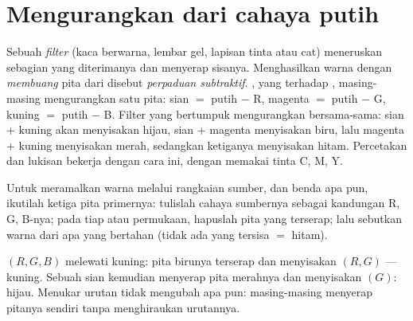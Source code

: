 \section{Mengurangkan dari cahaya putih}

\begin{definition}\label{def:g11:color-light-sources:subtractive}
Sebuah \emph{filter} (kaca berwarna, lembar gel, lapisan
tinta atau cat) meneruskan sebagian  yang diterimanya dan
menyerap sisanya. Menghasilkan warna dengan \emph{membuang} pita dari
 disebut \emph{perpaduan
subtraktif}. , yang
 terhadap , masing-masing mengurangkan
satu pita: sian $=$ putih $-$ R, magenta $=$ putih $-$ G, kuning $=$
putih $-$ B. Filter yang bertumpuk mengurangkan bersama-sama: sian $+$
kuning akan menyisakan hijau, sian $+$ magenta menyisakan biru,
lalu magenta $+$ kuning menyisakan merah, sedangkan ketiganya
menyisakan hitam. Percetakan dan lukisan bekerja dengan cara ini,
dengan memakai tinta C, M, Y.
\end{definition}

\begin{method}\label{met:g11:color-light-sources:bookkeeping}
Untuk meramalkan warna melalui rangkaian sumber,  dan benda apa
pun, ikutilah ketiga pita primernya: tulislah cahaya sumbernya sebagai
kandungan R, G, B-nya; pada tiap  atau permukaan, hapuslah pita
yang terserap; lalu sebutkan warna dari apa yang bertahan (tidak ada
yang tersisa $=$ hitam).
\end{method}

\begin{example}\label{ex:g11:color-light-sources:chain}
 $(R, G, B)$ melewati  kuning: pita birunya terserap
dan menyisakan $(R, G)$ --- kuning. Sebuah  sian kemudian
menyerap pita merahnya dan menyisakan $(G)$: hijau. Menukar urutan
 tidak mengubah apa pun: masing-masing menyerap pitanya
sendiri tanpa menghiraukan urutannya.
\end{example}

